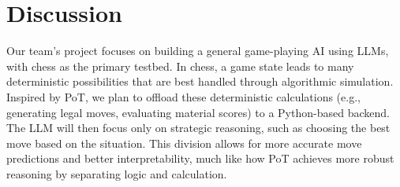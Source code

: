 \documentclass{article}
\begin{document}
\section{Discussion}

Our team’s project focuses on building a general game-playing AI using LLMs, with chess as the primary testbed. In chess, a game state leads to many deterministic possibilities that are best handled through algorithmic simulation. Inspired by PoT, we plan to offload these deterministic calculations (e.g., generating legal moves, evaluating material scores) to a Python-based backend. The LLM will then focus only on strategic reasoning, such as choosing the best move based on the situation. This division allows for more accurate move predictions and better interpretability, much like how PoT achieves more robust reasoning by separating logic and calculation.



\newpage


\end{document}
